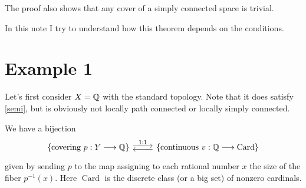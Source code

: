 \documentclass{article}
\newcommand{\Card}{\operatorname{Card}}
\begin{document}
\begin{remark}
    The proof also shows that any cover of a simply connected space is trivial.
\end{remark}

In this note I try to understand how this theorem depends on the conditions.

\section{Example 1}

Let's first consider $X=\mathbb{Q}$ with the standard topology. Note that it does satisfy \ref{semi}, but is obviously not locally path connected or locally simply connected.

\begin{theorem}
    We have a bijection
    \[\begin{tikzcd}[row sep=small]
        \left\{ \text{covering }p:Y\longrightarrow\Q \right\} \arrow[r, yshift=0.5ex, "1:1"] & \left\{ \text{continuous }v:\Q\longrightarrow\Card \right\} \arrow[l, yshift=-0.5ex]
    \end{tikzcd}\]
    given by sending $p$ to the map assigning to each rational number $x$ the size of the fiber $p^{-1}(x)$. Here $\Card$ is the discrete class (or a big set) of nonzero cardinals.
\end{theorem}
\end{document}

